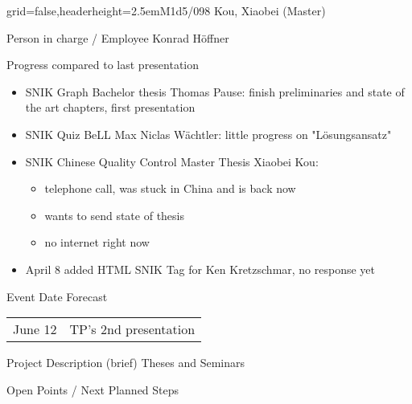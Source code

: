 \documentclass[]{kiesgrube}
\begin{document}
\begin{poster}%
{grid=false,headerheight=2.5em}{}{M1d5/098 Kou, Xiaobei (Master)}{}

\begin{posterbox}[name=person,column=0,row=0]{Person in charge / Employee}
Konrad Höffner
\end{posterbox}
\begin{posterbox}[name=progress,below=person]{Progress compared to last presentation}
\small
\begin{itemize}
\item SNIK Graph Bachelor thesis Thomas Pause: finish preliminaries and state of the art chapters, first presentation
\item SNIK Quiz BeLL Max Niclas Wächtler: little progress on "Lösungsansatz"
\item SNIK Chinese Quality Control Master Thesis Xiaobei Kou:
\begin{itemize}
\item telephone call, was stuck in China and is back now
\item wants to send state of thesis
\item no internet right now
\end{itemize}
\item April 8 added HTML SNIK Tag for Ken Kretzschmar, no response yet
\end{itemize}
\end{posterbox}
\begin{posterbox}[name=event,below=progress]{Event Date Forecast}
\begin{tabulary}{\textwidth}{lL}
June 12 	&TP's 2nd presentation\\
\end{tabulary}
\end{posterbox}
\begin{posterbox}[name=description,column=1,row=0]{Project Description (brief)}
Theses and Seminars
\end{posterbox}
\begin{posterbox}[name=open,column=1,below=description]{Open Points / Next Planned Steps}

\end{posterbox}
\end{poster}
\end{document}
